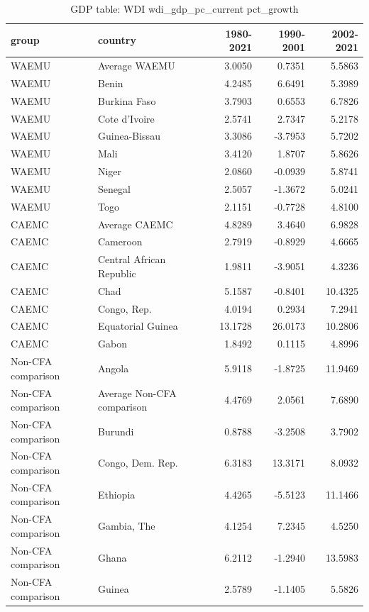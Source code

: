\begin{table}

\caption{GDP table: WDI wdi_gdp_pc_current pct_growth}
\centering
\begin{tabular}[t]{llrrr}
\toprule
group & country & 1980-2021 & 1990-2001 & 2002-2021\\
\midrule
WAEMU & Average WAEMU & 3.0050 & 0.7351 & 5.5863\\
WAEMU & Benin & 4.2485 & 6.6491 & 5.3989\\
WAEMU & Burkina Faso & 3.7903 & 0.6553 & 6.7826\\
WAEMU & Cote d'Ivoire & 2.5741 & 2.7347 & 5.2178\\
WAEMU & Guinea-Bissau & 3.3086 & -3.7953 & 5.7202\\
\addlinespace
WAEMU & Mali & 3.4120 & 1.8707 & 5.8626\\
WAEMU & Niger & 2.0860 & -0.0939 & 5.8741\\
WAEMU & Senegal & 2.5057 & -1.3672 & 5.0241\\
WAEMU & Togo & 2.1151 & -0.7728 & 4.8100\\
CAEMC & Average CAEMC & 4.8289 & 3.4640 & 6.9828\\
\addlinespace
CAEMC & Cameroon & 2.7919 & -0.8929 & 4.6665\\
CAEMC & Central African Republic & 1.9811 & -3.9051 & 4.3236\\
CAEMC & Chad & 5.1587 & -0.8401 & 10.4325\\
CAEMC & Congo, Rep. & 4.0194 & 0.2934 & 7.2941\\
CAEMC & Equatorial Guinea & 13.1728 & 26.0173 & 10.2806\\
\addlinespace
CAEMC & Gabon & 1.8492 & 0.1115 & 4.8996\\
Non-CFA comparison & Angola & 5.9118 & -1.8725 & 11.9469\\
Non-CFA comparison & Average Non-CFA comparison & 4.4769 & 2.0561 & 7.6890\\
Non-CFA comparison & Burundi & 0.8788 & -3.2508 & 3.7902\\
Non-CFA comparison & Congo, Dem. Rep. & 6.3183 & 13.3171 & 8.0932\\
\addlinespace
Non-CFA comparison & Ethiopia & 4.4265 & -5.5123 & 11.1466\\
Non-CFA comparison & Gambia, The & 4.1254 & 7.2345 & 4.5250\\
Non-CFA comparison & Ghana & 6.2112 & -1.2940 & 13.5983\\
Non-CFA comparison & Guinea & 2.5789 & -1.1405 & 5.5826\\

\end{tabular}
\end{table}
